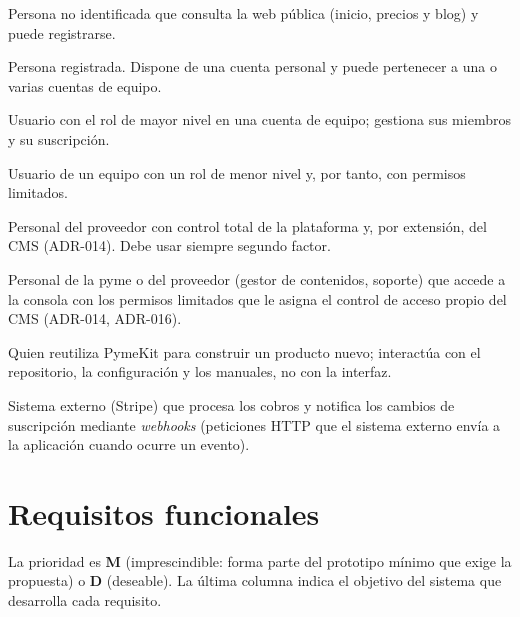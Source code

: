 \begin{description}[style=nextline]
  \item[Visitante.] Persona no identificada que consulta la web pública
        (inicio, precios y blog) y puede registrarse.
  \item[Usuario.] Persona registrada. Dispone de una cuenta personal y puede
        pertenecer a una o varias cuentas de equipo.
  \item[Propietario del equipo.] Usuario con el rol de mayor nivel en una
        cuenta de equipo; gestiona sus miembros y su suscripción.
  \item[Miembro.] Usuario de un equipo con un rol de menor nivel y, por
        tanto, con permisos limitados.
  \item[Super-administrador.] Personal del proveedor con control total de la
        plataforma y, por extensión, del CMS (ADR-014). Debe usar siempre
        segundo factor.
  \item[Personal del CMS.] Personal de la pyme o del proveedor (gestor de
        contenidos, soporte) que accede a la consola con los permisos
        limitados que le asigna el control de acceso propio del CMS
        (ADR-014, ADR-016).
  \item[Desarrollador.] Quien reutiliza PymeKit para construir un producto
        nuevo; interactúa con el repositorio, la configuración y los
        manuales, no con la interfaz.
  \item[Pasarela de pago.] Sistema externo (Stripe) que procesa los cobros y
        notifica los cambios de suscripción mediante \textit{webhooks}
        (peticiones HTTP que el sistema externo envía a la aplicación cuando
        ocurre un evento).
\end{description}

\section{Requisitos funcionales}
\label{sec:req-rf}

La prioridad es \textbf{M} (imprescindible: forma parte del prototipo mínimo
que exige la propuesta) o \textbf{D} (deseable). La última columna indica el
objetivo del sistema que desarrolla cada requisito.

